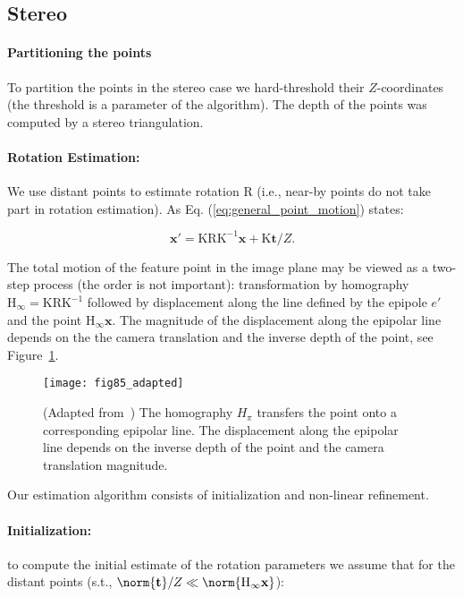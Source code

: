 \subsection{Stereo}\label{sec:stereo_moest}
\paragraph{Partitioning the points} To partition the points in the
stereo case we hard-threshold their $Z$-coordinates (the threshold is
a parameter of the algorithm).  The depth of the points was computed
by a stereo triangulation.

\paragraph{Rotation Estimation:}\label{sec:rotation_estimation}
We use distant points to estimate rotation $\mathrm{R}$ (i.e., near-by
points do not take part in rotation estimation). As Eq.
(\ref{eq:general_point_motion}) states:

\begin{equation}
  \mathbf{x}' = \mathrm{KRK^{-1}}\mathbf{x} + \mathrm{K}\mathbf{t}/Z.
\end{equation}

The total motion of the feature point in the image plane may be viewed
as a two-step process (the order is not important): transformation by
homography $\mathrm{H_\infty} = \mathrm{KRK^{-1}}$ followed by
displacement along the line defined by the epipole $e'$ and the point
$\mathrm{H_\infty}\mathbf{x}$.  The magnitude of the displacement
along the epipolar line depends on the the camera translation and the
inverse depth of the point, see Figure~\ref{fig:feature_motion}.

\begin{figure}[h]
  \centering
  \texttt{[image: fig85\_adapted]}
  \caption{(Adapted from~\cite{Hartley2004}) The homography $H_\pi$ transfers the point onto a corresponding epipolar line.  The displacement along the epipolar line depends on the inverse depth of the point and the camera translation magnitude.}
  \label{fig:feature_motion}
\end{figure}                                                             %

Our estimation algorithm consists of initialization and non-linear
refinement.
\paragraph{Initialization:} to compute the initial estimate of the rotation
parameters we assume that for the distant points (s.t., $\norm{\mathbf{t}}/Z \ll \norm{\mathrm{H_\infty}\mathbf{x}}$):

